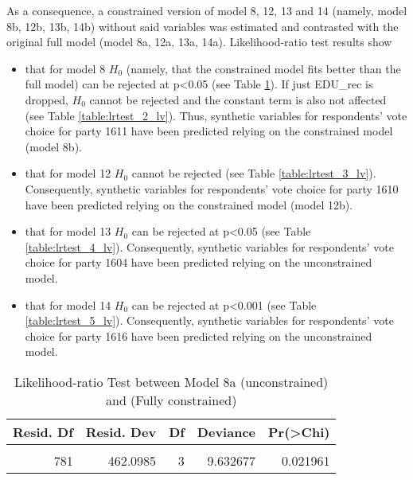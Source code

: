 \documentclass[
]{article}
\providecommand{\tightlist}{%
  \setlength{\itemsep}{0pt}\setlength{\parskip}{0pt}}
\begin{document}
As a consequence, a constrained version of model 8, 12, 13 and 14 (namely, model 8b, 12b, 13b, 14b) without said variables was
estimated and contrasted with the original full model (model 8a, 12a, 13a, 14a). Likelihood-ratio test results show

\begin{itemize}
\tightlist
\item
  that for model 8 \(H_0\) (namely, that the constrained model fits better than the full model) can be rejected at p\textless0.05 (see Table \ref{table:lrtest_1_lv}). If just EDU\_rec is dropped, \(H_0\) cannot be rejected and the constant term is also not affected (see Table \ref{table:lrtest_2_lv}). Thus, synthetic variables for respondents' vote choice for party 1611 have been predicted relying on the constrained model (model 8b).
\item
  that for model 12 \(H_0\) cannot be rejected (see Table \ref{table:lrtest_3_lv}). Consequently, synthetic variables for respondents' vote choice for
  party 1610 have been predicted relying on the constrained model (model 12b).
\item
  that for model 13 \(H_0\) can be rejected at p\textless0.05 (see Table \ref{table:lrtest_4_lv}). Consequently, synthetic variables for respondents' vote choice for
  party 1604 have been predicted relying on the unconstrained model.
\item
  that for model 14 \(H_0\) can be rejected at p\textless0.001 (see Table \ref{table:lrtest_5_lv}). Consequently, synthetic variables for respondents' vote choice for
  party 1616 have been predicted relying on the unconstrained model.
\end{itemize}

\begin{table}[!h]

\caption{\label{tab:unnamed-chunk-103}Likelihood-ratio Test between Model 8a (unconstrained) and (Fully constrained)
                  \label{table:lrtest_1_lv}}
\centering
\begin{tabular}[t]{r|r|r|r|r}
\hline
Resid. Df & Resid. Dev & Df & Deviance & Pr(>Chi)\\
\hline
\cellcolor{gray!6}{784} & \cellcolor{gray!6}{471.7312} & \cellcolor{gray!6}{} & \cellcolor{gray!6}{} & \cellcolor{gray!6}{}\\
\hline
781 & 462.0985 & 3 & 9.632677 & 0.021961\\
\hline
\end{tabular}
\end{table}
\end{document}
